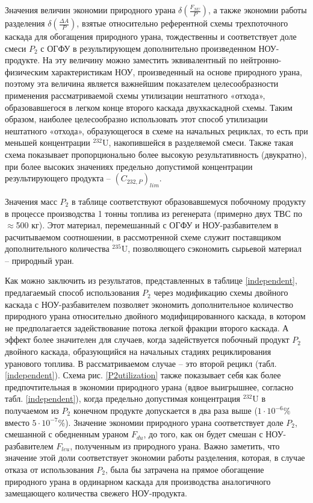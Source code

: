 Значения величин экономии природного урана $\delta(\frac{F_{NU}}{P})$, а также экономии работы разделения $\delta(\frac{\Delta A}{P})$, взятые относительно референтной схемы трехпоточного каскада для обогащения природного урана, тождественны и соответствует доле смеси $P_2$ с ОГФУ в результирующем дополнительно произведенном НОУ-продукте. На эту величину можно заместить эквивалентный по нейтронно-физическим характеристикам НОУ, произведенный на основе природного урана, поэтому эта величина является важнейшим показателем целесообразности применения рассматриваемой схемы утилизации нештатного «отхода», образовавшегося в легком конце второго каскада двухкаскадной схемы. Таким образом, наиболее целесообразно использовать этот способ утилизации нештатного «отхода», образующегося в схеме на начальных рециклах, то есть при меньшей концентрации $^{232}$U, накопившейся в разделяемой смеси. Также  такая схема показывает пропорционально более высокую результативность (двукратно), при более высоких значениях предельно допустимой концентрации результирующего продукта -- $(C_{232,P})_{lim}$.


Значения масс $P_2$ в таблице соответствуют образовавшемуся побочному продукту в процессе производства 1 тонны топлива из регенерата (примерно двух ТВС по $\approx$500 кг). Этот материал, перемешанный с ОГФУ и НОУ-разбавителем в расчитываемом соотношении, в рассмотренной схеме служит поставщиком дополнительного количества $^{235}$U, позволяющего сэкономить сырьевой материал -- природный уран.

Как можно заключить из результатов, представленных в таблице \ref{independent}, предлагаемый способ использования $P_2$ через модификацию схемы двойного каскада с НОУ-разбавителем позволяет экономить дополнительное количество природного урана относительно двойного модифицированного каскада, в котором не предполагается задействование потока легкой фракции второго каскада. А эффект более значителен для случаев, когда задействуется побочный продукт $P_2$ двойного каскада, образующийся на начальных стадиях рециклирования уранового топлива. В рассматриваемом случае -- это второй рецикл (табл. \ref{independent}). Схема рис. \ref{P2utilization} также показывает себя как более предпочтительная в экономии природного урана (вдвое выигрышнее, согласно табл. \ref{independent}), когда предельно допустимая концентрация $^{232}$U в получаемом из $P_2$ конечном продукте допускается в два раза выше ($1\cdot10^{-6}$\% вместо $5\cdot10^{-7}$\%).  Значение экономии природного урана соответствует доле $P_2$, смешанной с обедненным ураном $F_{du}$, до того, как он будет смешан с НОУ-разбавителем $F_{leu}$, полученным из природного урана. Важно заметить, что значение этой доли соответствует экономии работы разделения, которая, в случае отказа от использования $P_2$, была бы затрачена на прямое обогащение природного урана в ординарном каскада для производства аналогичного замещающего количества свежего НОУ-продукта.

